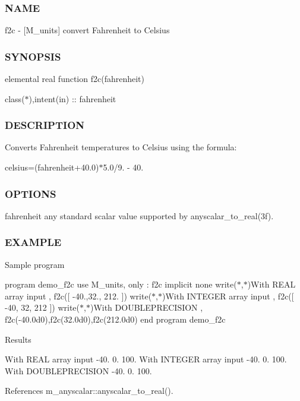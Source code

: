\subsubsection*{N\+A\+ME}

f2c -\/ \mbox{[}M\+\_\+units\mbox{]} convert Fahrenheit to Celsius \subsubsection*{S\+Y\+N\+O\+P\+S\+IS}

elemental real function f2c(fahrenheit)

class($\ast$),intent(in) \+:\+: fahrenheit \subsubsection*{D\+E\+S\+C\+R\+I\+P\+T\+I\+ON}

Converts Fahrenheit temperatures to Celsius using the formula\+:

celsius=(fahrenheit+40.0)$\ast$5.0/9. -\/ 40. \subsubsection*{O\+P\+T\+I\+O\+NS}

fahrenheit any standard scalar value supported by anyscalar\+\_\+to\+\_\+real(3f). \subsubsection*{E\+X\+A\+M\+P\+LE}

Sample program

program demo\+\_\+f2c use M\+\_\+units, only \+: f2c implicit none write($\ast$,$\ast$)\textquotesingle{}With R\+E\+AL array input \textquotesingle{}, f2c(\mbox{[} -\/40.,32., 212. \mbox{]}) write($\ast$,$\ast$)\textquotesingle{}With I\+N\+T\+E\+G\+ER array input \textquotesingle{}, f2c(\mbox{[} -\/40, 32, 212 \mbox{]}) write($\ast$,$\ast$)\textquotesingle{}With D\+O\+U\+B\+L\+E\+P\+R\+E\+C\+I\+S\+I\+ON \textquotesingle{}, f2c(-\/40.\+0d0),f2c(32.\+0d0),f2c(212.\+0d0) end program demo\+\_\+f2c

Results

With R\+E\+AL array input -\/40. 0. 100. With I\+N\+T\+E\+G\+ER array input -\/40. 0. 100. With D\+O\+U\+B\+L\+E\+P\+R\+E\+C\+I\+S\+I\+ON -\/40. 0. 100. 

References m\+\_\+anyscalar\+::anyscalar\+\_\+to\+\_\+real().

